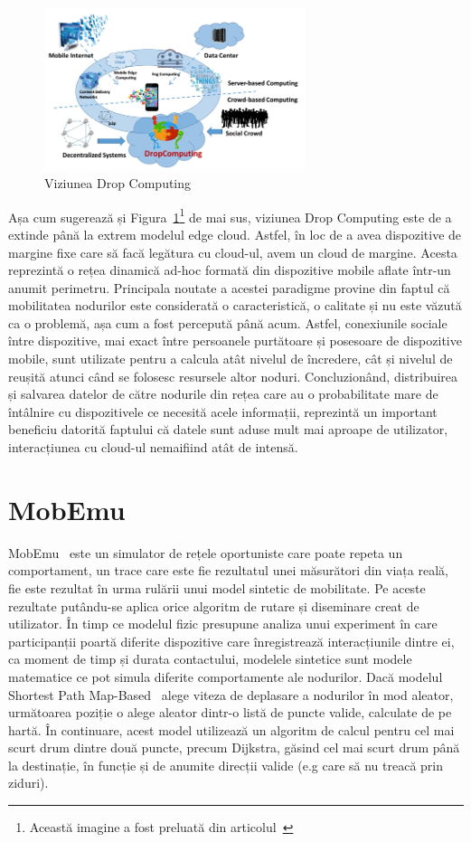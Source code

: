 \documentclass[12pt,a4paper]{report}
\begin{document}
\begin{figure}[th]
\centering
\includegraphics[width=3in]{pics/dropComputing.png}
  \caption{Viziunea Drop Computing}
  \label{fig:pic2}
\end{figure}
Așa cum sugerează și Figura~\ref{fig:pic2}\footnote{Această imagine a fost preluată din articolul~\cite{DC}} de mai sus, viziunea Drop Computing este de a extinde până la extrem modelul edge cloud. Astfel, în loc de a avea dispozitive de margine fixe care să facă legătura cu cloud-ul, avem un cloud de margine. Acesta reprezintă o rețea dinamică ad-hoc formată din dispozitive mobile aflate într-un anumit perimetru. Principala noutate a acestei paradigme provine din faptul că mobilitatea nodurilor este considerată o caracteristică, o calitate și nu este văzută ca o problemă, așa cum a fost percepută până acum. Astfel, conexiunile sociale între dispozitive, mai exact între persoanele purtătoare și posesoare de dispozitive mobile, sunt utilizate pentru a calcula atât nivelul de încredere, cât și nivelul de reușită atunci când se folosesc resursele altor noduri. Concluzionând, distribuirea și salvarea datelor de către nodurile din rețea care au o probabilitate mare de întâlnire cu dispozitivele ce necesită acele informații, reprezintă un important beneficiu datorită faptului că datele sunt aduse mult mai aproape de utilizator, interacțiunea cu cloud-ul nemaifiind atât de intensă.

\iffalse
\section{MobEmu}
MobEmu~\cite{MobEmuArticle} este un simulator de rețele oportuniste care poate repeta un comportament, un trace care este fie rezultatul unei măsurători din viața reală, fie este rezultat în urma rulării unui model sintetic de mobilitate. Pe aceste rezultate putându-se aplica orice algoritm de rutare și diseminare creat de utilizator.
În timp ce modelul fizic presupune analiza unui experiment în care participanții poartă diferite dispozitive care înregistrează interacțiunile dintre ei, ca moment de timp și durata contactului, modelele sintetice sunt modele matematice ce pot simula diferite comportamente ale nodurilor. Dacă modelul Shortest Path Map-Based~\cite{ShortestPathMapBased} alege viteza de deplasare a nodurilor în mod aleator, următoarea poziție o alege aleator dintr-o listă de puncte valide, calculate de pe hartă. În continuare, acest model utilizează un algoritm de calcul pentru cel mai scurt drum dintre două puncte, precum Dijkstra, găsind cel mai scurt drum până la destinație, în funcție și de anumite direcții valide (e.g care să nu treacă prin ziduri). 
\end{document}
